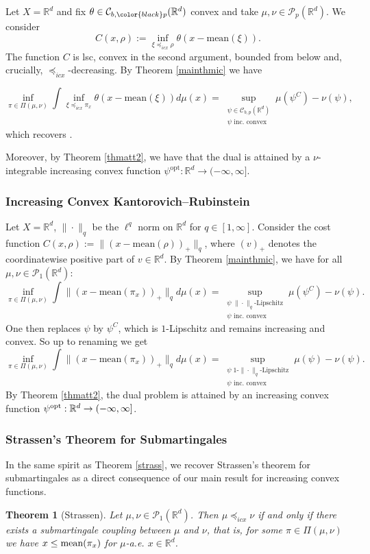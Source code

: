 \documentclass[reqno, a4paper]{amsart}
\newcommand{\lic}{\preceq_{icx}}
\newtheorem{theorem}{Theorem}[section]
\newcommand{\PP}{\mathcal{P}}
\newcommand{\cP}{\mathcal{P}}
\renewcommand{\P}{\cP}
\newcommand{\R}{\mathbb R}
\theoremstyle{definition}
\theoremstyle{definition}
\theoremstyle{definition}
\newcommand{\mean}{\mathrm{mean}}
\begin{document}
Let $X=\R^d$ and fix $\theta\in{\mathcal{C}}_{b,{\color{black}p}}(\R^d)$ convex and take $\mu,\nu\in\P_p(\R^d)$.  We consider  $$C(x,\rho):=\inf_{\xi\lic\rho}\theta(x-\mean(\xi)).$$ 
The function $C$ is lsc, convex in the second argument, bounded from below and, crucially,  $\lic$-decreasing. By Theorem \ref{mainthmic}  we have

$$\inf_{\pi\in\Pi(\mu,\nu)} \int \inf_{\xi\lic\pi_x}\theta(x-\mean(\xi))d\mu(x)= \sup_{\substack{\psi \in {\mathcal{C}}^{}_{b,p}(\R^d) \\ \psi\text{ inc. convex}}} \mu(\psi^C) - \nu(\psi),$$
which recovers \cite[Theorem 6.1]{backhoffveraguas2020applicationsweaktransporttheory}. 

Moreover, by Theorem \ref{thmatt2}, we have that the dual is attained by a $\nu$-integrable increasing convex function $\psi^{\text{opt}}:\R^d\to(-\infty,\infty]$. %

\subsubsection{Increasing Convex Kantorovich--Rubinstein}
Let $X=\R^d$,  $\|\cdot\|_q$ be the $\ell^q$ norm on $\R^d$ for $q\in[1,\infty]$. Consider the cost function $C(x,\rho):=\|(x-\mean(\rho))_+\|_q$, where $(v)_+$ denotes the coordinatewise positive part of $v\in \R^d$. By Theorem \ref{mainthmic}, we have for all $\mu,\nu\in\PP_1(\R^d)$:
$$\inf_{\pi\in\Pi(\mu,\nu)} \int \|(x-\mean(\pi_x))_+\|_q d\mu(x)=\sup_{\substack{\psi \; \|\cdot\|_q\text{-Lipschitz}\\\psi\text{ inc. convex}}} \mu(\psi^C)-\nu(\psi).$$
One then replaces $\psi$ by $\psi^C$, which is $1$-Lipschitz and remains increasing and convex. So up to renaming we get
$$\inf_{\pi\in\Pi(\mu,\nu)} \int \|(x-\mean(\pi_x))_+\|_q d\mu(x)=\sup_{\substack{\psi \;1\text{-}\| \cdot\|_q\text{-Lipschitz}\\\psi\text{ inc. convex}}} \mu(\psi)-\nu(\psi).$$
By Theorem \ref{thmatt2}, the dual problem is attained by an increasing convex function $\psi^{\textnormal {opt}}:\R^d\to(-\infty, \infty ]$.


\subsubsection{Strassen's Theorem for Submartingales}
In the same spirit as Theorem \ref{strass}, we recover Strassen's theorem for submartingales as a direct consequence of our main result for increasing convex functions.
\begin{theorem}[Strassen] \label{strass2} Let $\mu,\nu\in\PP_1(\R^d)$. Then $\mu\lic\nu$ if and only if there exists a submartingale coupling between $\mu$ and $\nu$, that is, for some $\pi\in\Pi(\mu,\nu)$ we have $x\leq\textnormal{mean}(\pi_x)$ for $\mu$-a.e. $x\in \R^d$.
    
\end{theorem}
\end{document}
